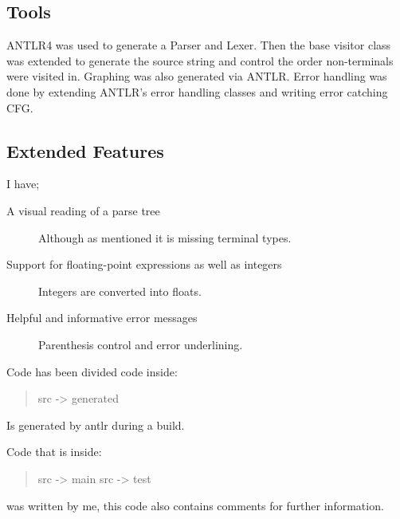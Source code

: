 \documentclass[a4paper,12pt]{article}
\begin{document}
\subsection{Tools}
ANTLR4 was used to generate a Parser and Lexer. Then the base visitor class was extended to generate the source string and control the order non-terminals were visited in. Graphing was also generated via ANTLR. Error handling was done by extending ANTLR's error handling classes and writing error catching \gls{CFG}.

\subsection{Extended Features}
I have;
\begin{description}
    \item[A visual reading of a parse tree] \hfill
        Although as mentioned it is missing terminal types.
    \item[Support for floating-point expressions as well as integers] \hfill
        Integers are converted into floats.
    \item[Helpful and informative error messages]
        Parenthesis control and error underlining.
\end{description}

Code has been divided code inside:
\begin{quotation}
src -> generated
\end{quotation}
Is generated by antlr during a build.


Code that is inside:
\begin{quotation}
src -> main
src -> test
\end{quotation}
was written by me, this code also contains comments for further information.
\end{document}
